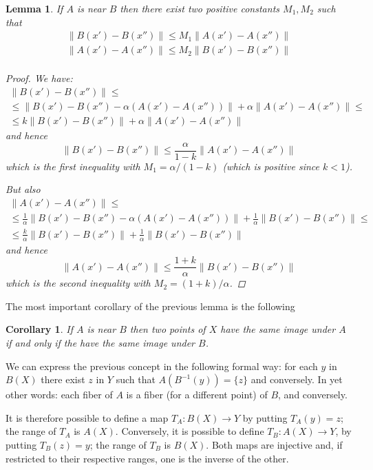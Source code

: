 \documentclass[12pt]{article}
\theoremstyle{normale}
\newtheorem{corollary}[theorem]{Corollary}
\newtheorem{lemma}[theorem]{Lemma}
\theoremstyle{liscio}
\providecommand{\norm}[1]{\lVert#1\rVert}
\begin{document}
\begin{lemma}\label{control}
If $A$ is near $B$ then there exist two positive constants $M_1,
M_2$ such that
\begin{gather*}
\norm{B(x') - B(x'')} \leq M_1 \norm{A(x') - A(x'')} \\
\norm{A(x') - A(x'')} \leq M_2 \norm{B(x') - B(x'')} \\
\end{gather*}
\begin{proof}
We have:
\begin{multline*}
\norm{B(x')- B(x'')} \leq \\
\leq \norm{B(x') - B(x'') - \alpha ( A(x') - A(x'') ) } +
\alpha \norm{A(x') - A(x'')} \leq \\
\leq k \norm{B(x')- B(x'')} + \alpha \norm{A(x') - A(x'')}
\end{multline*}
and hence
\[
\norm{B(x') - B(x'')} \leq \frac{\alpha}{1-k} \norm{A(x') - A(x'')}
\]
which is the first inequality with $M_1 = \alpha/(1-k)$ (which is
positive since $k < 1$).

But also
\begin{multline*}
\norm{A(x')- A(x'')} \leq \\
\leq \frac{1}{\alpha}\norm{B(x') - B(x'') - \alpha ( A(x') - A(x'') ) } +
\frac{1}{\alpha} \norm{B(x') - B(x'')} \leq \\
\leq \frac{k}{\alpha} \norm{B(x')- B(x'')} + 
\frac{1}{\alpha} \norm{B(x') - B(x'')}
\end{multline*}
and hence
\[
\norm{A(x') - A(x'')} \leq \frac{1+k}{\alpha} \norm{B(x') - B(x'')}
\]
which is the second inequality with $M_2 = (1+k)/\alpha$.
\end{proof}
\end{lemma}

The most important corollary of the previous lemma is the
following
\begin{corollary}
If $A$ is near $B$ then two points of $X$ have the same image
under $A$ if and only if the have the same image under $B$.
\end{corollary}

We can express the previous concept in the following formal way:
for each $y$ in $B(X)$ there exist $z$ in $Y$ such that
$A(B^{-1}(y)) = \{z\}$ and conversely. In yet other words: each
fiber of $A$ is a fiber (for a different point) of $B$, and
conversely.

It is therefore possible to define a map $T_A:B(X) \to Y$ by
putting $T_A(y) = z$; the range of $T_A$ is $A(X)$. Conversely, it
is possible to define $T_B:A(X) \to Y$, by putting $T_B(z) = y$;
the range of $T_B$ is $B(X)$. Both maps are injective and, if
restricted to their respective ranges, one is the inverse of the
other.
\end{document}

